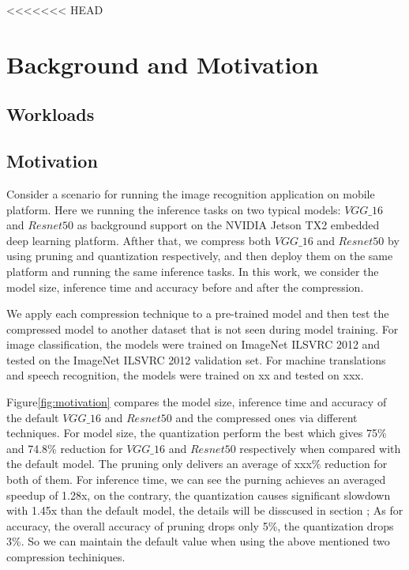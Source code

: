 <<<<<<< HEAD
\section{Background and Motivation}
\subsection{Workloads}

\subsection{Motivation}
Consider a scenario for running the image recognition application on mobile platform.
Here we running the inference tasks on
two typical models: $VGG\_16$ and $Resnet50$ as background
support on the NVIDIA Jetson TX2 embedded deep learning platform.
Afther that, we compress both $VGG\_16$ and $Resnet50$ by using pruning
and quantization respectively, and then deploy them on the same platform
and running the same inference tasks.
In this work, we consider the
model size, inference time and accuracy before and after the compression.

 We apply each compression technique to a pre-trained model and then test the compressed model to another dataset that
is not seen during model training. For image classification, the \CNN models were trained on ImageNet ILSVRC 2012 and tested on the
ImageNet ILSVRC 2012 validation set. For machine translations and speech recognition, the models were trained on xx and tested on xxx.


Figure\ref{fig:motivation} compares the model size, inference time and accuracy of the default
$VGG\_16$ and $Resnet50$ and the compressed ones via different techniques.
For model size, the quantization perform the best which gives 75\% and 74.8\%
reduction for $VGG\_16$ and $Resnet50$ respectively when compared with the default model.
The pruning only delivers an average of xxx\% reduction for both of them.
For inference time, we can see the purning achieves an averaged speedup of 1.28x,
on the contrary, the quantization causes significant slowdown with 1.45x than the default model,
the details will be disscused in section \FIXME{};
As for accuracy,  the overall accuracy of pruning drops only 5\%, the quantization drops 3\%.
So we can maintain the default value when using the above mentioned two compression techiniques.
